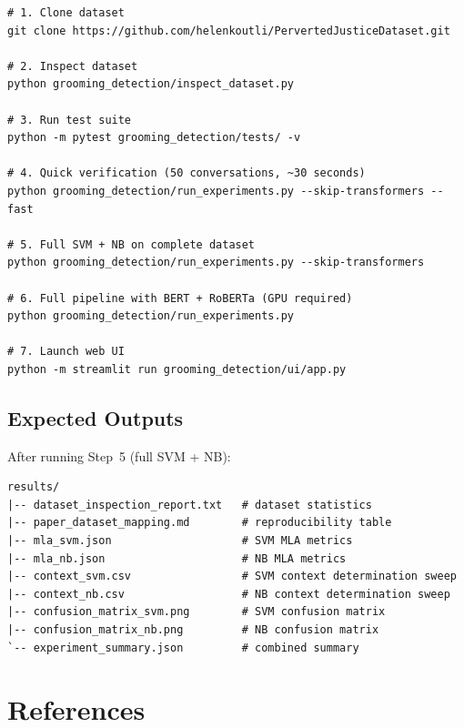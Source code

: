 \documentclass[12pt,a4paper]{article}
\begin{document}
\begin{lstlisting}
# 1. Clone dataset
git clone https://github.com/helenkoutli/PervertedJusticeDataset.git

# 2. Inspect dataset
python grooming_detection/inspect_dataset.py

# 3. Run test suite
python -m pytest grooming_detection/tests/ -v

# 4. Quick verification (50 conversations, ~30 seconds)
python grooming_detection/run_experiments.py --skip-transformers --fast

# 5. Full SVM + NB on complete dataset
python grooming_detection/run_experiments.py --skip-transformers

# 6. Full pipeline with BERT + RoBERTa (GPU required)
python grooming_detection/run_experiments.py

# 7. Launch web UI
python -m streamlit run grooming_detection/ui/app.py
\end{lstlisting}

\subsection{Expected Outputs}

After running Step~5 (full SVM + NB):

\begin{lstlisting}
results/
|-- dataset_inspection_report.txt   # dataset statistics
|-- paper_dataset_mapping.md        # reproducibility table
|-- mla_svm.json                    # SVM MLA metrics
|-- mla_nb.json                     # NB MLA metrics
|-- context_svm.csv                 # SVM context determination sweep
|-- context_nb.csv                  # NB context determination sweep
|-- confusion_matrix_svm.png        # SVM confusion matrix
|-- confusion_matrix_nb.png         # NB confusion matrix
`-- experiment_summary.json         # combined summary
\end{lstlisting}

\section*{References}
\end{document}
